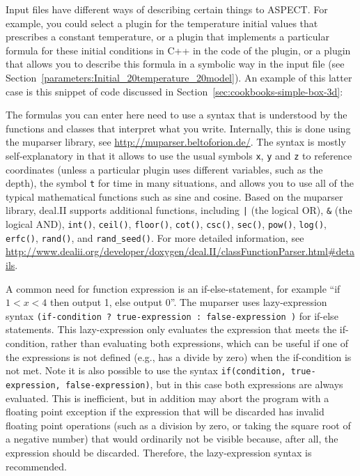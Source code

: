 \documentclass{article}
\newcommand{\aspect}{\textsc{ASPECT}}
\begin{document}
Input files have different ways of describing certain things to \aspect{}. For
example, you could select a plugin for the temperature initial values that
prescribes a constant temperature, or a
plugin that implements a particular formula for these initial conditions in
C++ in the code of the plugin, or a
plugin that allows you to describe this formula in a symbolic way in the input file
(see Section~\ref{parameters:Initial_20temperature_20model}). An example of this latter
case is this snippet of code discussed in
Section~\ref{sec:cookbooks-simple-box-3d}:
%

%
The formulas you can enter here need to use a syntax that is understood by the
functions and classes that interpret what you write. Internally, this is done
using the muparser library, see \url{http://muparser.beltoforion.de/}. The
syntax is mostly self-explanatory in that it allows to use the usual symbols
\texttt{x}, \texttt{y} and \texttt{z} to reference coordinates (unless a
particular plugin uses different variables, such as the depth), the symbol
\texttt{t} for time in many situations, and allows you to use all of the
typical mathematical functions such as sine and cosine. Based on the muparser
library, deal.II supports additional functions, including \texttt{|} (the logical OR), \texttt{\&} (the logical AND),
\texttt{int()}, \texttt{ceil()}, \texttt{floor()}, \texttt{cot()},
\texttt{csc()}, \texttt{sec()}, \texttt{pow()}, \texttt{log()},
\texttt{erfc()}, \texttt{rand()}, and \texttt{rand\_seed()}.
For more detailed information, see
\url{http://www.dealii.org/developer/doxygen/deal.II/classFunctionParser.html#details}.

A common need for function expression is an if-else-statement, for example
``if $1<x<4$ then output 1, else output 0''.
The muparser uses lazy-expression syntax \texttt{(if-condition ?\ true-expression :\ false-expression )}
for if-else statements. This lazy-expression only evaluates the expression that meets the
if-condition, rather than evaluating both expressions, which can be useful if one of the
expressions is not defined (e.g., has a divide by zero) when the if-condition is not met.
Note it is also possible to use the syntax \texttt{if(condition, true-expression, false-expression)},
but in this case both expressions are always evaluated. This is inefficient, but in addition may abort the program with a floating point exception if the expression that will be discarded has invalid floating point operations (such as a division by zero, or taking the square root of a negative number) that would ordinarily not be visible because, after all, the expression should be discarded.
Therefore, the lazy-expression syntax is recommended.
\end{document}
